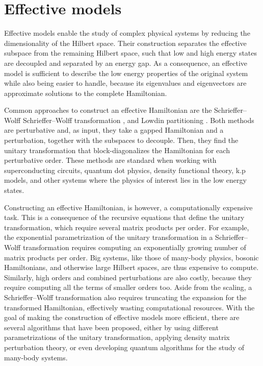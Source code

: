 \section{Effective models}

Effective models enable the study of complex physical systems by reducing the
dimensionality of the Hilbert space.
Their construction separates the effective subspace from the remaining Hilbert
space, such that low and high energy states are decoupled and separated by an
energy gap.
As a consequence, an effective model is sufficient to describe the low energy
properties of the original system while also being easier to handle, because
its eigenvalues and eigenvectors are approximate solutions to the complete
Hamiltonian.

Common approaches to construct an effective Hamiltonian are the Schrieffer--Wolff
Schrieffer--Wolff transformation
\cite{Schrieffer_1966}, \cite{Bravyi_2011}
and Lowdin partitioning \cite{White_1950}.
Both methods are perturbative and, as input, they take a gapped Hamiltonian and
a perturbation, together with the subspaces to decouple.
Then, they find the unitary transformation that block-diagonalizes the
Hamiltonian for each perturbative order.
These methods are standard when working with superconducting circuits,
quantum dot physics, density functional theory, k.p models, and other
systems where the physics of interest lies in the low energy states.

Constructing an effective Hamiltonian, is however, a computationally expensive
task.
This is a consequence of the recursive equations that define the unitary
transformation, which require several matrix products per order.
For example, the exponential parametrization of the unitary
transformation in a Schrieffer--Wolff transformation requires computing
an exponentially growing number of matrix products per order.
Big systems, like those of many-body physics, bosonic Hamiltonians, and
otherwise large Hilbert spaces, are thus expensive to compute.
Similarly, high orders and combined perturbations are also costly, because they
require computing all the terms of smaller orders too.
Aside from the scaling, a Schrieffer--Wolff transformation also requires
truncating the expansion for the transformed Hamiltonian, effectively wasting
computational resources.
With the goal of making the construction of effective models more efficient,
there are several algorithms that have been proposed, either by using different
parametrizations of the unitary transformation, applying density matrix
perturbation theory, or even developing quantum algorithms for the study
of many-body systems.

